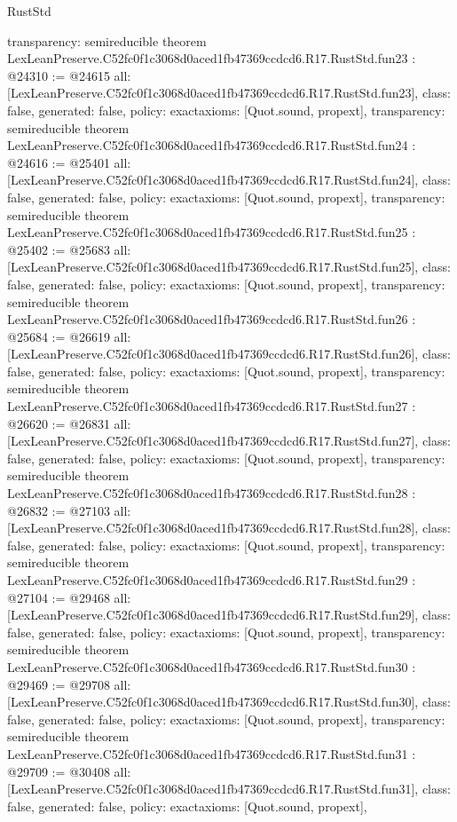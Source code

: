 \begin{lexlean}{RustStd}
\begin{coremodule}
{  transparency: semireducible
}
theorem LexLeanPreserve.C52fc0f1c3068d0aced1fb47369ccdcd6.R17.RustStd.fun23 : @24310 := @24615 {
  all: [LexLeanPreserve.C52fc0f1c3068d0aced1fb47369ccdcd6.R17.RustStd.fun23],
  class: false,
  generated: false,
  policy: exact{axioms: [Quot.sound, propext]},
  transparency: semireducible
}
theorem LexLeanPreserve.C52fc0f1c3068d0aced1fb47369ccdcd6.R17.RustStd.fun24 : @24616 := @25401 {
  all: [LexLeanPreserve.C52fc0f1c3068d0aced1fb47369ccdcd6.R17.RustStd.fun24],
  class: false,
  generated: false,
  policy: exact{axioms: [Quot.sound, propext]},
  transparency: semireducible
}
theorem LexLeanPreserve.C52fc0f1c3068d0aced1fb47369ccdcd6.R17.RustStd.fun25 : @25402 := @25683 {
  all: [LexLeanPreserve.C52fc0f1c3068d0aced1fb47369ccdcd6.R17.RustStd.fun25],
  class: false,
  generated: false,
  policy: exact{axioms: [Quot.sound, propext]},
  transparency: semireducible
}
theorem LexLeanPreserve.C52fc0f1c3068d0aced1fb47369ccdcd6.R17.RustStd.fun26 : @25684 := @26619 {
  all: [LexLeanPreserve.C52fc0f1c3068d0aced1fb47369ccdcd6.R17.RustStd.fun26],
  class: false,
  generated: false,
  policy: exact{axioms: [Quot.sound, propext]},
  transparency: semireducible
}
theorem LexLeanPreserve.C52fc0f1c3068d0aced1fb47369ccdcd6.R17.RustStd.fun27 : @26620 := @26831 {
  all: [LexLeanPreserve.C52fc0f1c3068d0aced1fb47369ccdcd6.R17.RustStd.fun27],
  class: false,
  generated: false,
  policy: exact{axioms: [Quot.sound, propext]},
  transparency: semireducible
}
theorem LexLeanPreserve.C52fc0f1c3068d0aced1fb47369ccdcd6.R17.RustStd.fun28 : @26832 := @27103 {
  all: [LexLeanPreserve.C52fc0f1c3068d0aced1fb47369ccdcd6.R17.RustStd.fun28],
  class: false,
  generated: false,
  policy: exact{axioms: [Quot.sound, propext]},
  transparency: semireducible
}
theorem LexLeanPreserve.C52fc0f1c3068d0aced1fb47369ccdcd6.R17.RustStd.fun29 : @27104 := @29468 {
  all: [LexLeanPreserve.C52fc0f1c3068d0aced1fb47369ccdcd6.R17.RustStd.fun29],
  class: false,
  generated: false,
  policy: exact{axioms: [Quot.sound, propext]},
  transparency: semireducible
}
theorem LexLeanPreserve.C52fc0f1c3068d0aced1fb47369ccdcd6.R17.RustStd.fun30 : @29469 := @29708 {
  all: [LexLeanPreserve.C52fc0f1c3068d0aced1fb47369ccdcd6.R17.RustStd.fun30],
  class: false,
  generated: false,
  policy: exact{axioms: [Quot.sound, propext]},
  transparency: semireducible
}
theorem LexLeanPreserve.C52fc0f1c3068d0aced1fb47369ccdcd6.R17.RustStd.fun31 : @29709 := @30408 {
  all: [LexLeanPreserve.C52fc0f1c3068d0aced1fb47369ccdcd6.R17.RustStd.fun31],
  class: false,
  generated: false,
  policy: exact{axioms: [Quot.sound, propext]},
}
\end{coremodule}
\end{lexlean}
